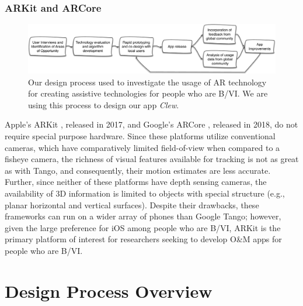 \documentclass[chi_draft]{sigchi}
\newcommand{\BVI}{B/VI\xspace}
\newcommand{\OM}{O\&M\xspace}
\begin{document}
\subsubsection{ARKit and ARCore}
\begin{figure}
\includegraphics[width=\linewidth]{Figures/designprocess}
\caption{Our design process used to investigate the usage of AR technology for creating assistive technologies for people who are \BVI.  We are using this process to design our app \emph{Clew}.\label{fig:designprocess}}
\end{figure}
Apple's ARKit \cite{arkit}, released in 2017, and Google's ARCore \cite{arcore}, released in 2018, do not require special purpose hardware.  Since these platforms utilize conventional cameras, which have comparatively limited field-of-view when compared to a fisheye camera, the richness of visual features available for tracking is not as great as with Tango, and consequently, their motion estimates are less accurate.  Further, since neither of these platforms have depth sensing cameras, the availability of 3D information is limited to objects with special structure (e.g., planar horizontal and vertical surfaces).  Despite their drawbacks, these frameworks can run on a wider array of phones than Google Tango; however, given the large preference for iOS among people who are \BVI \cite{morris2014blind}, ARKit is the primary platform of interest for researchers seeking to develop \OM apps for people who are \BVI.


\section{Design Process Overview}
\end{document}
